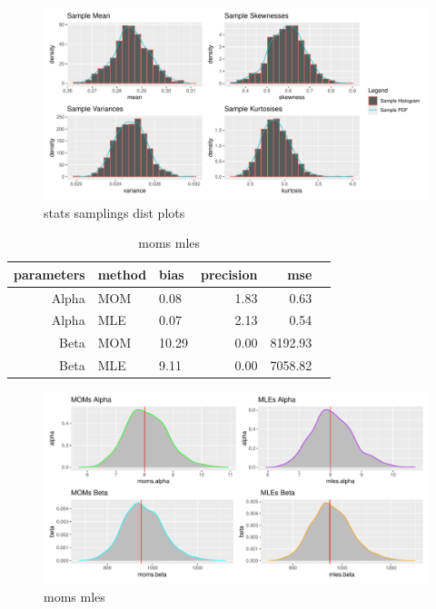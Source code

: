 \documentclass{article}\usepackage[]{graphicx}\usepackage[]{xcolor}
\makeatletter
\def\maxwidth{ %
  \ifdim\Gin@nat@width>\linewidth
    \linewidth
  \else
    \Gin@nat@width
  \fi
}
\newenvironment{knitrout}{}{} %
\makeatother
\begin{document}
\begin{figure}[H]
 \begin{center}
\begin{knitrout}
\color{fgcolor}
\includegraphics[width=\maxwidth]{figure/unnamed-chunk-5-1} 
\end{knitrout}
 \caption{stats samplings dist plots}
 \label{plot4} %
 \end{center}
 \end{figure}
 
 \begin{table}[ht]
\centering
\begin{tabular}{rllrrr}
  \hline
 parameters & method & bias & precision & mse \\ 
  \hline
    Alpha & MOM & 0.08 & 1.83 & 0.63 \\ 
    Alpha & MLE & 0.07 & 2.13 & 0.54 \\ 
    Beta & MOM & 10.29 & 0.00 & 8192.93 \\ 
    Beta & MLE & 9.11 & 0.00 & 7058.82 \\ 
   \hline
\end{tabular}
\caption{mles moms}
\label{table3}

\begin{figure}[H]
 \begin{center}
\begin{knitrout}
\color{fgcolor}
\includegraphics[width=\maxwidth]{figure/unnamed-chunk-6-1} 
\end{knitrout}
 \caption{moms mles}
 \label{plot5} %
 \end{center}
 \end{figure}

\end{table}
\end{document}
